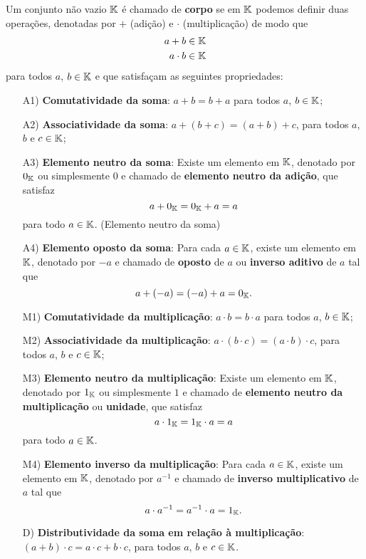 \begin{definicao}
Um conjunto n\~ao vazio $\mathbb{K}$ \'e chamado de \textbf{corpo} se em $\mathbb{K}$ podemos definir duas opera\c{c}\~oes, denotadas por
$+$ (adi\c{c}\~ao) e $\cdot$ (multiplica\c{c}\~ao) de modo que
\begin{align*}
a + b \in \mathbb{K}\\
a \cdot b \in \mathbb{K}
\end{align*}
para todos $a$, $b \in \mathbb{K}$ e que satisfa\c{c}am as seguintes propriedades:
\begin{itemize}

	\item[A1)] \textbf{Comutatividade da soma}: $a + b = b + a$ para todos $a$, $b \in \mathbb{K}$;
	\item[A2)] \textbf{Associatividade da soma}: $a + (b + c) = (a + b) + c$, para todos $a$, $b$ e $c \in \mathbb{K}$;
	\item[A3)] \textbf{Elemento neutro da soma}: Existe um elemento em $\mathbb{K}$, denotado por $0_{\mathbb{K}}$ ou simplesmente $0$ e chamado de \textbf{elemento neutro da adi\c{c}\~ao}, que satisfaz
	\[
	a + 0_{\mathbb{K}} = 0_{\mathbb{K}} + a = a
	\]
	para todo $a \in \mathbb{K}$. (Elemento neutro da soma)
	\item[A4)] \textbf{Elemento oposto da soma}: Para cada $a \in \mathbb{K}$, existe um elemento em $\mathbb{K}$, denotado por $-a$ e chamado de \textbf{oposto} de $a$ ou \textbf{inverso aditivo} de $a$ tal que
	\[
	a + (-a) = (-a) + a = 0_{\mathbb{K}}.
	\]
	\item[M1)] \textbf{Comutatividade da multiplica\c{c}\~ao}: $a \cdot b = b \cdot a$ para todos $a$, $b \in \mathbb{K}$;
	\item[M2)] \textbf{Associatividade da multiplica\c{c}\~ao}: $a \cdot (b \cdot c) = (a \cdot b) \cdot c$, para todos $a$, $b$ e $c \in \mathbb{K}$;
	\item[M3)] \textbf{Elemento neutro da multiplica\c{c}\~ao}: Existe um elemento em $\mathbb{K}$, denotado por $1_{\mathbb{K}}$ ou simplesmente $1$ e chamado de \textbf{elemento neutro da multiplica\c{c}\~ao} ou \textbf{unidade}, que satisfaz
	\[
	a \cdot 1_{\mathbb{K}} = 1_{\mathbb{K}} \cdot a = a
	\]
	para todo $a \in \mathbb{K}$.
	\item[M4)] \textbf{Elemento inverso da multiplica\c{c}\~ao}: Para cada $a \in \mathbb{K}$, existe um elemento em $\mathbb{K}$, denotado por $a^{-1}$ e chamado de \textbf{inverso multiplicativo} de $a$ 
	tal que
	\[
	a \cdot a^{-1} = a^{-1} \cdot a = 1_{\mathbb{K}}.
	\]
	\item[D)] \textbf{Distributividade da soma em rela\c{c}\~ao \`a multiplica\c{c}\~ao}: $(a + b)\cdot c = a\cdot c + b\cdot c$, para todos $a$, $b$ e $c \in \mathbb{K}$.
\end{itemize}
\end{definicao}

